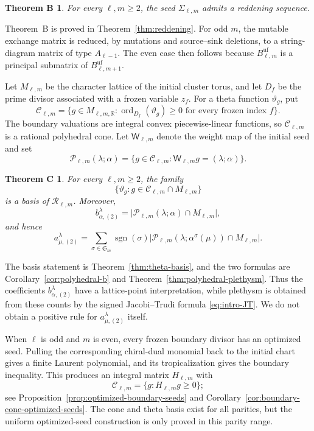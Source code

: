 \documentclass[11pt]{amsart}
\newtheorem*{theoremB}{Theorem B}
\newtheorem*{theoremC}{Theorem C}
\theoremstyle{definition}
\theoremstyle{remark}
\newcommand{\cR}{\mathcal R}
\newcommand{\frakS}{\mathfrak S}
\begin{document}
\begin{theoremB}
For every $\ell,m\ge2$, the seed $\Sigma_{\ell,m}$ admits a reddening
sequence.
\end{theoremB}

Theorem~B is proved in Theorem~\ref{thm:reddening}.  For odd $m$, the
mutable exchange matrix is reduced, by mutations and source--sink
deletions, to a string-diagram matrix of type $A_{\ell-1}$.  The even case
then follows because $B_{\ell,m}^{\mathrm{uf}}$ is a principal submatrix of
$B_{\ell,m+1}^{\mathrm{uf}}$.

Let $M_{\ell,m}$ be the character lattice of the initial cluster torus, and
let $D_f$ be the prime divisor associated with a frozen variable $z_f$.
For a theta function $\vartheta_g$, put
\[ \mathscr C_{\ell,m} =\{g\in M_{\ell,m,\mathbb R}: \operatorname{ord}_{D_f}(\vartheta_g)\ge0 \text{ for every frozen index }f\}. \]
The boundary valuations are integral convex piecewise-linear functions, so
$\mathscr C_{\ell,m}$ is a rational polyhedral cone.  Let
$\mathsf W_{\ell,m}$ denote the weight map of the initial seed and set
\[ \mathscr P_{\ell,m}(\lambda;\alpha) =\{g\in\mathscr C_{\ell,m}: \mathsf W_{\ell,m}g=(\lambda;\alpha)\}. \]

\begin{theoremC}
For every $\ell,m\ge2$, the family
\[ \{\vartheta_g:g\in\mathscr C_{\ell,m}\cap M_{\ell,m}\} \]
is a basis of $\cR_{\ell,m}$.  Moreover,
\[ b_{\alpha,(2)}^\lambda =\bigl|\mathscr P_{\ell,m}(\lambda;\alpha)\cap M_{\ell,m}\bigr|, \]
and hence
\[ a_{\mu,(2)}^\lambda =\sum_{\sigma\in\frakS_m}\operatorname{sgn}(\sigma) \bigl|\mathscr P_{\ell,m} (\lambda;\alpha^\sigma(\mu))\cap M_{\ell,m}\bigr|. \]
\end{theoremC}

The basis statement is Theorem~\ref{thm:theta-basis}, and the two formulas
are Corollary~\ref{cor:polyhedral-b} and
Theorem~\ref{thm:polyhedral-plethysm}.  Thus the coefficients
$b_{\alpha,(2)}^\lambda$ have a lattice-point interpretation, while plethysm is
obtained from these counts by the signed Jacobi--Trudi formula
\eqref{eq:intro-JT}.  We do not obtain a positive rule for
$a_{\mu,(2)}^\lambda$ itself.

When $\ell$ is odd and $m$ is even, every frozen boundary divisor has an
optimized seed.  Pulling the corresponding chiral-dual monomial back to the
initial chart gives a finite Laurent polynomial, and its tropicalization
gives the boundary inequality.  This produces an integral matrix
$H_{\ell,m}$ with
\[ \mathscr C_{\ell,m} =\{g:H_{\ell,m}g\ge0\}; \]
see Proposition~\ref{prop:optimized-boundary-seeds} and
Corollary~\ref{cor:boundary-cone-optimized-seeds}.  The cone and theta basis
exist for all parities, but the uniform optimized-seed construction is only
proved in this parity range.
\end{document}
